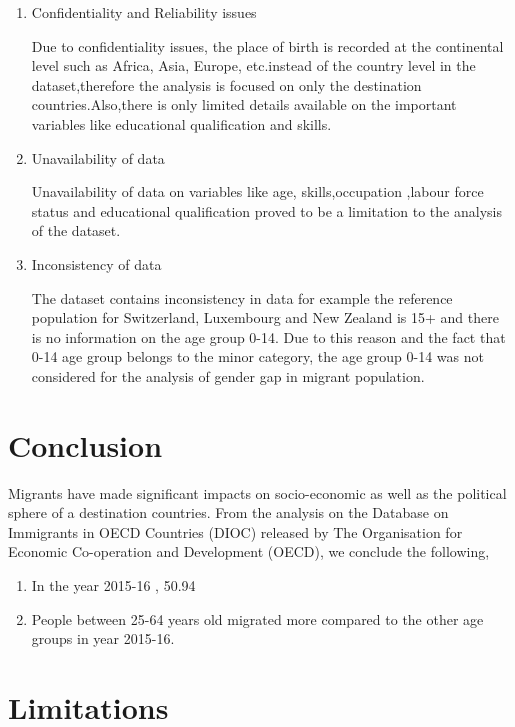 \documentclass[11pt,a4paper,]{article}
\begin{document}
\begin{enumerate}

   \item Confidentiality and Reliability issues 

Due to confidentiality issues, the place of birth is recorded at the continental level such as Africa, Asia, Europe, etc.instead of the country level in the dataset,therefore the analysis is focused on only the destination countries.Also,there is only limited details available on the important variables like educational qualification and skills. 

   \item Unavailability of data

Unavailability of data on variables like age, skills,occupation ,labour force status and educational qualification proved to be a limitation to the analysis of the dataset.

  \item  Inconsistency of data
 
 The dataset contains inconsistency in data for example the reference population for Switzerland, Luxembourg and New Zealand is 15+ and there is no information on the age group 0-14. Due to this reason and the fact that 0-14 age group belongs to the minor category, the age group 0-14  was not considered for the analysis of gender gap in migrant population.  
 
\end{enumerate}

\section*{Conclusion}

Migrants have made significant impacts on socio-economic as well as the political sphere of a destination countries. From the analysis on the Database on Immigrants in OECD Countries (DIOC) released by The Organisation for Economic Co-operation and Development (OECD), we conclude the following,

\begin{enumerate}

\item In the year 2015-16 , 50.94 %

\item People between 25-64 years old migrated more compared to the other age groups in year 2015-16. 

\end{enumerate}\section*{Limitations}
\end{document}
